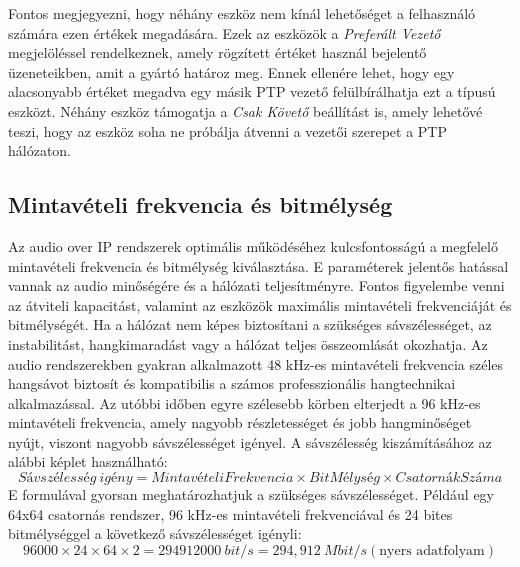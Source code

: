 Fontos megjegyezni, hogy néhány eszköz nem kínál lehetőséget a felhasználó
számára ezen értékek megadására. Ezek az eszközök a \textit{Preferált
Vezető} megjelöléssel rendelkeznek, amely rögzített értéket használ
bejelentő üzeneteikben, amit a gyártó határoz meg. Ennek ellenére
lehet, hogy egy alacsonyabb értéket megadva egy másik PTP vezető
felülbírálhatja ezt a típusú eszközt. Néhány eszköz támogatja a
\textit{Csak Követő} beállítást is, amely lehetővé teszi, hogy az
eszköz soha ne próbálja átvenni a vezetői szerepet a PTP hálózaton.

\subsection{Mintavételi frekvencia és bitmélység}
Az audio over IP rendszerek optimális működéséhez kulcsfontosságú a megfelelő mintavételi frekvencia
és bitmélység kiválasztása. E paraméterek jelentős hatással vannak az audio minőségére
és a hálózati teljesítményre. Fontos figyelembe venni az átviteli kapacitást, valamint
az eszközök maximális mintavételi frekvenciáját és bitmélységét. Ha a hálózat nem
képes biztosítani a szükséges sávszélességet, az instabilitást, hangkimaradást vagy
a hálózat teljes összeomlását okozhatja. Az audio rendszerekben gyakran alkalmazott
48 kHz-es mintavételi frekvencia széles hangsávot biztosít és kompatibilis a
számos professzionális hangtechnikai alkalmazással. Az utóbbi időben egyre szélesebb
körben elterjedt a 96 kHz-es mintavételi frekvencia, amely nagyobb részletességet
és jobb hangminőséget nyújt, viszont nagyobb sávszélességet igényel. A sávszélesség
kiszámításához az alábbi képlet használható:
\begin{equation}
	\label{eq:sávszélesség}
	Sávszélesség\ igény = MintavételiFrekvencia \times BitMélység \times CsatornákSzáma
\end{equation}
E formulával gyorsan meghatározhatjuk a szükséges sávszélességet. Például egy
64x64 csatornás rendszer, 96 kHz-es mintavételi frekvenciával és 24 bites
bitmélységgel a következő sávszélességet igényli:
\begin{equation}
	\label{eq:sávszélesség}
	96000 \times 24 \times 64 \times 2 = 294912000\ bit/s = 294,912\ Mbit/s (\text{nyers adatfolyam})
\end{equation}
